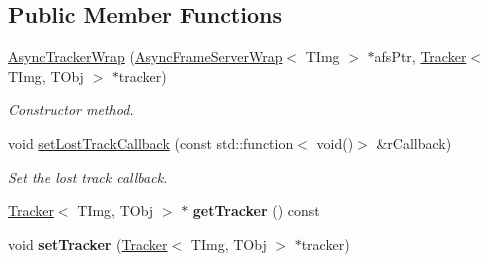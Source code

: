 \subsection*{Public Member Functions}
\begin{DoxyCompactItemize}
\item 
\hypertarget{class_vision_core_1_1_async_1_1_async_tracker_wrap_a1a4463f9a48cbd9bd54494d430d9f656}{}\hyperlink{class_vision_core_1_1_async_1_1_async_tracker_wrap_a1a4463f9a48cbd9bd54494d430d9f656}{Async\+Tracker\+Wrap} (\hyperlink{class_vision_core_1_1_async_1_1_async_frame_server_wrap}{Async\+Frame\+Server\+Wrap}$<$ T\+Img $>$ $\ast$afs\+Ptr, \hyperlink{class_vision_core_1_1_interfaces_1_1_tracker}{Tracker}$<$ T\+Img, T\+Obj $>$ $\ast$tracker)\label{class_vision_core_1_1_async_1_1_async_tracker_wrap_a1a4463f9a48cbd9bd54494d430d9f656}

\begin{DoxyCompactList}\small\item\em Constructor method. \end{DoxyCompactList}\item 
\hypertarget{class_vision_core_1_1_async_1_1_async_tracker_wrap_a39c25715a3846239ec1380955fb49e19}{}void \hyperlink{class_vision_core_1_1_async_1_1_async_tracker_wrap_a39c25715a3846239ec1380955fb49e19}{set\+Lost\+Track\+Callback} (const std\+::function$<$ void()$>$ \&r\+Callback)\label{class_vision_core_1_1_async_1_1_async_tracker_wrap_a39c25715a3846239ec1380955fb49e19}

\begin{DoxyCompactList}\small\item\em Set the lost track callback. \end{DoxyCompactList}\item 
\hypertarget{class_vision_core_1_1_async_1_1_async_tracker_wrap_a67d8937141cc8d2766bc0119a4eabe21}{}\hyperlink{class_vision_core_1_1_interfaces_1_1_tracker}{Tracker}$<$ T\+Img, T\+Obj $>$ $\ast$ {\bfseries get\+Tracker} () const \label{class_vision_core_1_1_async_1_1_async_tracker_wrap_a67d8937141cc8d2766bc0119a4eabe21}

\item 
\hypertarget{class_vision_core_1_1_async_1_1_async_tracker_wrap_a9556d32505a461b5af0782dfe13e2bce}{}void {\bfseries set\+Tracker} (\hyperlink{class_vision_core_1_1_interfaces_1_1_tracker}{Tracker}$<$ T\+Img, T\+Obj $>$ $\ast$tracker)\label{class_vision_core_1_1_async_1_1_async_tracker_wrap_a9556d32505a461b5af0782dfe13e2bce}

\end{DoxyCompactItemize}
